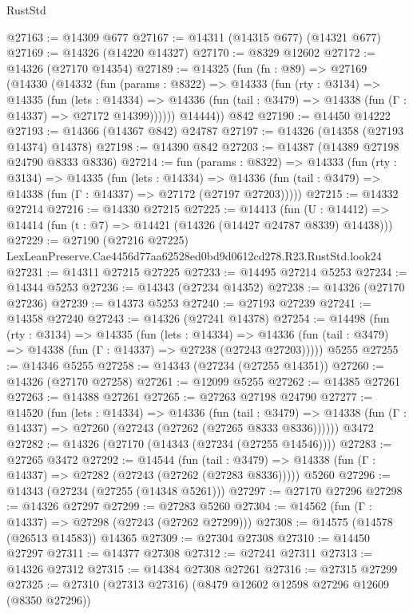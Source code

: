 \begin{lexlean}{RustStd}
\begin{coremodule}
@27163 := @14309 @677
@27167 := @14311 (@14315 @677) (@14321 @677)
@27169 := @14326 (@14220 @14327)
@27170 := @8329 @12602
@27172 := @14326 (@27170 @14354)
@27189 := @14325
    (fun (fn : @89) =>
    @27169
      (@14330
        (@14332
          (fun (params : @8322) =>
          @14333
            (fun (rty : @3134) =>
            @14335
              (fun (lets : @14334) =>
              @14336 (fun (tail : @3479) => @14338 (fun (Γ : @14337) => @27172 @14399))))))
        @14444))
    @842
@27190 := @14450 @14222
@27193 := @14366 (@14367 @842) @24787
@27197 := @14326 (@14358 (@27193 @14374) @14378)
@27198 := @14390 @842
@27203 := @14387 (@14389 @27198 @24790 @8333 @8336)
@27214 := fun (params : @8322) =>
  @14333
    (fun (rty : @3134) =>
    @14335
      (fun (lets : @14334) =>
      @14336 (fun (tail : @3479) => @14338 (fun (Γ : @14337) => @27172 (@27197 @27203)))))
@27215 := @14332 @27214
@27216 := @14330 @27215
@27225 := @14413
    (fun (U : @14412) => @14414 (fun (t : @7) => @14421 (@14326 (@14427 @24787 @8339) @14438)))
@27229 := @27190
    (@27216 @27225)
    LexLeanPreserve.Cae4456d77aa62528ed0bd9d0612cd278.R23.RustStd.look24
@27231 := @14311 @27215 @27225
@27233 := @14495 @27214 @5253
@27234 := @14344 @5253
@27236 := @14343 (@27234 @14352)
@27238 := @14326 (@27170 @27236)
@27239 := @14373 @5253
@27240 := @27193 @27239
@27241 := @14358 @27240
@27243 := @14326 (@27241 @14378)
@27254 := @14498
    (fun (rty : @3134) =>
    @14335
      (fun (lets : @14334) =>
      @14336 (fun (tail : @3479) => @14338 (fun (Γ : @14337) => @27238 (@27243 @27203)))))
    @5255
@27255 := @14346 @5255
@27258 := @14343 (@27234 (@27255 @14351))
@27260 := @14326 (@27170 @27258)
@27261 := @12099 @5255
@27262 := @14385 @27261
@27263 := @14388 @27261
@27265 := @27263 @27198 @24790
@27277 := @14520
    (fun (lets : @14334) =>
    @14336
      (fun (tail : @3479) =>
      @14338 (fun (Γ : @14337) => @27260 (@27243 (@27262 (@27265 @8333 @8336))))))
    @3472
@27282 := @14326 (@27170 (@14343 (@27234 (@27255 @14546))))
@27283 := @27265 @3472
@27292 := @14544
    (fun (tail : @3479) => @14338 (fun (Γ : @14337) => @27282 (@27243 (@27262 (@27283 @8336)))))
    @5260
@27296 := @14343 (@27234 (@27255 (@14348 @5261)))
@27297 := @27170 @27296
@27298 := @14326 @27297
@27299 := @27283 @5260
@27304 := @14562 (fun (Γ : @14337) => @27298 (@27243 (@27262 @27299)))
@27308 := @14575 (@14578 (@26513 @14583)) @14365
@27309 := @27304 @27308
@27310 := @14450 @27297
@27311 := @14377 @27308
@27312 := @27241 @27311
@27313 := @14326 @27312
@27315 := @14384 @27308 @27261
@27316 := @27315 @27299
@27325 := @27310 (@27313 @27316) (@8479 @12602 @12598 @27296 @12609 (@8350 @27296))

\end{coremodule}
\end{lexlean}
